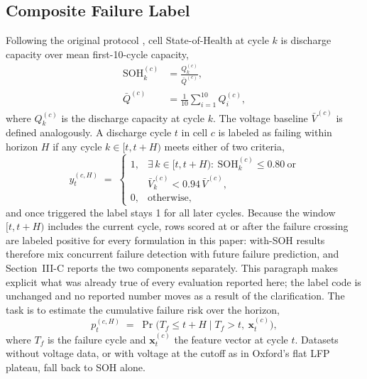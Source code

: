 \documentclass[preprint,12pt]{elsarticle}
\begin{document}
\subsection{Composite Failure Label}
Following the original protocol \cite{shikdar2026learning}, cell State-of-Health at cycle $k$ is discharge capacity over mean first-10-cycle capacity,
\begin{equation}\label{eq:soh}
\begin{aligned}
\mathrm{SOH}_k^{(c)} &= \frac{Q_k^{(c)}}{\bar{Q}^{(c)}},\\[2pt]
\bar{Q}^{(c)} &= \frac{1}{10}\sum_{i=1}^{10} Q_i^{(c)},
\end{aligned}
\end{equation}
where $Q_k^{(c)}$ is the discharge capacity at cycle $k$. The voltage baseline $\bar{V}^{(c)}$ is defined analogously. A discharge cycle $t$ in cell $c$ is labeled as failing within horizon $H$ if any cycle $k\in[t,t{+}H)$ meets either of two criteria,
\begin{equation}\label{eq:label}
y_t^{(c,H)} \;=\; \begin{cases}
1, & \exists\, k\in[t,t{+}H):\ \mathrm{SOH}_k^{(c)}\le 0.80 \ \text{or}\\[2pt]
& \bar{V}_k^{(c)} < 0.94\,\bar{V}^{(c)},\\[2pt]
0, & \text{otherwise,}
\end{cases}
\end{equation}
and once triggered the label stays 1 for all later cycles. Because the window $[t,t{+}H)$ includes the current cycle, rows scored at or after the failure crossing are labeled positive for every formulation in this paper: with-SOH results therefore mix concurrent failure detection with future failure prediction, and Section~III-C reports the two components separately. This paragraph makes explicit what was already true of every evaluation reported here; the label code is unchanged and no reported number moves as a result of the clarification. The task is to estimate the cumulative failure risk over the horizon,
\begin{equation}\label{eq:risk}
p_t^{(c,H)} \;=\; \Pr\!\bigl(T_f \le t{+}H \mid T_f > t,\ \mathbf{x}_t^{(c)}\bigr),
\end{equation}
where $T_f$ is the failure cycle and $\mathbf{x}_t^{(c)}$ the feature vector at cycle $t$. Datasets without voltage data, or with voltage at the cutoff as in Oxford's flat LFP plateau, fall back to SOH alone.
\end{document}
